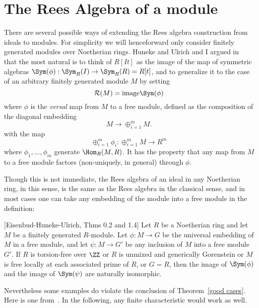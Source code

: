 \documentclass[twoside,12pt, leqno]{amsart}
\def\image{{\rm image}}
\def\RR{{\mathcal R}}
\begin{document}
\section{The Rees Algebra of a module} There are several possible ways of extending the Rees algebra construction from ideals to modules. For simplicity we will henceforward only consider finitely generated modules
over Noetherian rings. Huneke and Ulrich and I argued in~\cite{EHU} that the most natural is
to think of $R[It]$ as the image of the map of symmetric algebras
$\Sym(\phi): \Sym_R(I) \to \Sym_R(R) = R[t]$, and to generalize it to the case of
an arbitrary finitely generated module $M$ by setting
$$
\RR(M) = \image \Sym(\phi)
$$ 
where $\phi$ is the \emph{versal} map from $M$ to a free module, defined as 
the composition of 
the diagonal 
embedding 
$$
M \to \oplus_{i=1}^mM.
$$
with the map
$$
\oplus_{i=1}^m\phi_i: \oplus_{i=1}^mM \to R^{m}
$$ 
where
$\phi_1,\dots, \phi_m$ generate $\Hom_R(M,R)$.
It has the property that any map from $M$ to a free module factors (non-uniquely, in general) through $\phi$. 

Though this is not immediate, the Rees algebra of an ideal in any Noetherian ring, in this sense,
 is the same as the Rees algebra in the classical sense, and in most cases one can take
 any embedding of the module into a free module in the definition:
 
\begin{theorem}\label{good cases} [Eisenbud-Huneke-Ulrich, Thms 0.2 and 1.4] Let $R$ be a Noetherian ring
     and let $M$ be a finitely generated $R$-module. Let $\phi: M \to G$
     be the universal embedding of $M$ in a free module, and let
     $\psi: M \to G'$  be any inclusion of $M$ into a free module $G'$. 
     If $R$ is torsion-free over $\ZZ$
     or $R$ is unmixed and generically Gorenstein or $M$ is free locally
     at each associated prime of $R$, or $G=R$, then the image of $\Sym(\phi)$ and the
     image of $\Sym(\psi)$ are naturally isomorphic.
\end{theorem}

Nevertheless some examples do violate the conclusion of Theorem~\ref{good cases}. Here is one from~\cite{EHU}.
     In the following, any finite characteristic would work as well.
     
\end{document}
